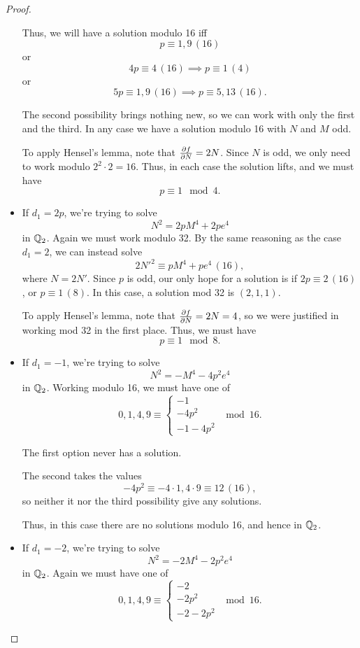 \documentclass[12pt, a4paper]{amsart}
\begin{document}
\begin{proof}
\begin{itemize}
    Thus, we will have a solution modulo 16 iff
    \[p \equiv 1,9 \, (16)\]
    or
    \[4p \equiv 4 \, (16) \implies p \equiv 1 \, (4)\]
    or
    \[5p \equiv 1, 9 \, (16) \implies p \equiv 5, 13 \, (16). \] 
    
    The second possibility brings nothing new, so we can work with only the
    first and the third. In any case we have a solution modulo 16 with $N$ and
    $M$ odd.

    To apply Hensel's lemma, note that $\frac{\partial f}{\partial N} = 2N$. Since $N$ is odd,
    we only need to work modulo $2^2 \cdot 2 = 16$. Thus, in each
    case the solution lifts, and we must have
    \[p \equiv 1 \mod{4}.\]
    
    \item If $d_1 = 2p$, we're trying to solve
      \[N^2 = 2pM^4 + 2pe^4 \] in ${\mathbb Q}_2$. Again we must work modulo 32. By
      the same reasoning as the case $d_1 = 2$, we can instead solve
      \[2N'^2 \equiv pM^4 + pe^4 \, (16),\]
      where $N = 2N'.$ Since $p$ is odd, our only hope for a solution is
      if $2p \equiv 2 \,(16)$, or $p \equiv 1 \, (8).$ In this case, a solution
      mod 32 is $(2, 1,1).$

      To apply Hensel's lemma, note that $\frac{\partial f}{\partial N} = 2N = 4$, so we were
      justified in working mod 32 in the first place. Thus, we must have
      \[p \equiv 1 \mod{8}.\]
      
    \item If $d_1 = -1$, we're trying to solve
    \[N^2 = -M^4 - 4p^2e^4 \] in ${\mathbb Q}_2$. 
    Working modulo 16, we must have one of
    \[0, 1, 4, 9 \equiv
      \begin{cases}
        -1 \\
        -4p^2 \\
        -1-4p^2
      \end{cases} \mod{16}.
    \]

    The first option never has a solution.

    The second takes the values
    \[-4p^2 \equiv -4\cdot 1, 4 \cdot 9 \equiv 12 \, (16),\]
    so neither it nor the third possibility give any solutions.

    Thus, in this case there are no solutions modulo 16, and hence in ${\mathbb Q}_2$.


    \item If $d_1 = -2$, we're trying to solve
    \[N^2 = -2M^4 - 2p^2e^4 \] in ${\mathbb Q}_2$. 
    Again we must have one of
    \[0, 1, 4, 9 \equiv
      \begin{cases}
        -2 \\
        -2p^2 \\
        -2-2p^2
      \end{cases} \mod{16}.
    \]


\end{itemize}
\end{proof}
\end{document}
